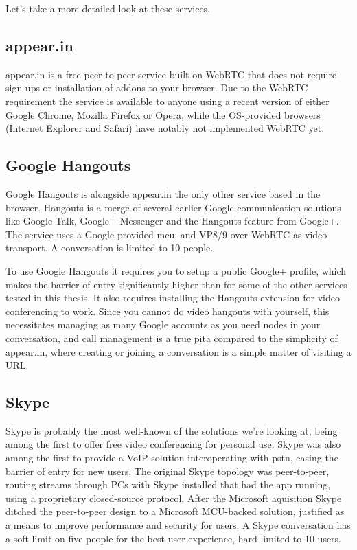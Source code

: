 Let's take a more detailed look at these services.

\subsection{appear.in}

appear.in is a free peer-to-peer service built on WebRTC that does not require sign-ups or installation of addons to your browser. Due to the WebRTC requirement the service is available to anyone using a recent version of either Google Chrome, Mozilla Firefox or Opera, while the OS-provided browsers (Internet Explorer and Safari) have notably not implemented WebRTC yet.



\subsection{Google Hangouts}

Google Hangouts is alongside appear.in the only other service based in the browser. Hangouts is a merge of several earlier Google communication solutions like Google Talk, Google+ Messenger and the Hangouts feature from Google+. The service uses a Google-provided \gls{mcu}, and VP8/9 over WebRTC as video transport. A conversation is limited to 10 people.

To use Google Hangouts it requires you to setup a public Google+ profile, which makes the barrier of entry significantly higher than for some of the other services tested in this thesis. It also requires installing the Hangouts extension for video conferencing to work. Since you cannot do video hangouts with yourself, this necessitates managing as many Google accounts as you need nodes in your conversation, and call management is a true \gls{pita} compared to the simplicity of appear.in, where creating or joining a conversation is a simple matter of visiting a URL.


\subsection{Skype}

Skype is probably the most well-known of the solutions we're looking at, being among the first to offer free video conferencing for personal use. Skype was also among the first to provide a VoIP solution interoperating with \gls{pstn}, easing the barrier of entry for new users. The original Skype topology was peer-to-peer, routing streams through PCs with Skype installed that had the app running, using a proprietary closed-source protocol. After the Microsoft aquisition Skype ditched the peer-to-peer design to a Microsoft MCU-backed solution, justified as a means to improve performance and security for users. A Skype conversation has a soft limit on five people for the best user experience, hard limited to 10 users.

